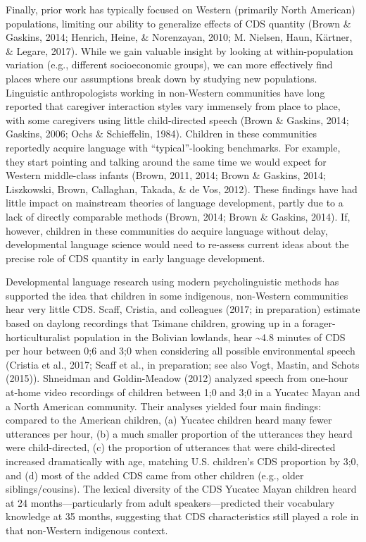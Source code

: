 \documentclass[floatsintext,man]{apa6}
\theoremstyle{definition}
\theoremstyle{definition}
\theoremstyle{definition}
\theoremstyle{remark}
\begin{document}
Finally, prior work has typically focused on Western (primarily North
American) populations, limiting our ability to generalize effects of CDS
quantity (Brown \& Gaskins, 2014; Henrich, Heine, \& Norenzayan, 2010;
M. Nielsen, Haun, Kärtner, \& Legare, 2017). While we gain valuable
insight by looking at within-population variation (e.g., different
socioeconomic groups), we can more effectively find places where our
assumptions break down by studying new populations. Linguistic
anthropologists working in non-Western communities have long reported
that caregiver interaction styles vary immensely from place to place,
with some caregivers using little child-directed speech (Brown \&
Gaskins, 2014; Gaskins, 2006; Ochs \& Schieffelin, 1984). Children in
these communities reportedly acquire language with
\enquote{typical}-looking benchmarks. For example, they start pointing
and talking around the same time we would expect for Western
middle-class infants (Brown, 2011, 2014; Brown \& Gaskins, 2014;
Liszkowski, Brown, Callaghan, Takada, \& de Vos, 2012). These findings
have had little impact on mainstream theories of language development,
partly due to a lack of directly comparable methods (Brown, 2014; Brown
\& Gaskins, 2014). If, however, children in these communities do acquire
language without delay, developmental language science would need to
re-assess current ideas about the precise role of CDS quantity in early
language development.

Developmental language research using modern psycholinguistic methods
has supported the idea that children in some indigenous, non-Western
communities hear very little CDS. Scaff, Cristia, and colleagues (2017;
in preparation) estimate based on daylong recordings that Tsimane
children, growing up in a forager-horticulturalist population in the
Bolivian lowlands, hear \textasciitilde{}4.8 minutes of CDS per hour
between 0;6 and 3;0 when considering all possible environmental speech
(Cristia et al., 2017; Scaff et al., in preparation; see also Vogt,
Mastin, and Schots (2015)). Shneidman and Goldin-Meadow (2012) analyzed
speech from one-hour at-home video recordings of children between 1;0
and 3;0 in a Yucatec Mayan and a North American community. Their
analyses yielded four main findings: compared to the American children,
(a) Yucatec children heard many fewer utterances per hour, (b) a much
smaller proportion of the utterances they heard were child-directed, (c)
the proportion of utterances that were child-directed increased
dramatically with age, matching U.S. children's CDS proportion by 3;0,
and (d) most of the added CDS came from other children (e.g., older
siblings/cousins). The lexical diversity of the CDS Yucatec Mayan
children heard at 24 months---particularly from adult
speakers---predicted their vocabulary knowledge at 35 months, suggesting
that CDS characteristics still played a role in that non-Western
indigenous context.
\end{document}
